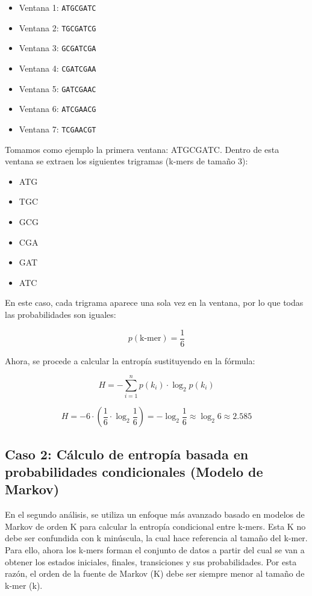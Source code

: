 \documentclass[11pt,spanish,listoffigures,listoftables]{tfgetsinf}
\begin{document}
\begin{itemize}
    \item Ventana 1: \texttt{ATGCGATC}
    \item Ventana 2: \texttt{TGCGATCG}
    \item Ventana 3: \texttt{GCGATCGA}
    \item Ventana 4: \texttt{CGATCGAA}
    \item Ventana 5: \texttt{GATCGAAC}
    \item Ventana 6: \texttt{ATCGAACG}
    \item Ventana 7: \texttt{TCGAACGT}
\end{itemize}

Tomamos como ejemplo la primera ventana: ATGCGATC. Dentro de esta ventana se extraen los siguientes trigramas (k-mers de tamaño 3):

\begin{itemize}
    \item ATG
    \item TGC
    \item GCG
    \item CGA
    \item GAT
    \item ATC
\end{itemize}

En este caso, cada trigrama aparece una sola vez en la ventana, por lo que todas las probabilidades son iguales:

\[
p(\text{k-mer}) = \frac{1}{6}
\]

Ahora, se procede a calcular la entropía sustituyendo en la fórmula:

\[
H = - \sum_{i=1}^{n} p(k_i) \cdot \log_2 p(k_i)
\]

\[
H = - 6 \cdot \left( \frac{1}{6} \cdot \log_2 \frac{1}{6} \right) = - \log_2 \frac{1}{6} \approx \log_2 6 \approx 2.585
\]


\subsection{Caso 2: Cálculo de entropía basada en probabilidades condicionales (Modelo de Markov)}

En el segundo análisis, se utiliza un enfoque más avanzado basado en modelos de Markov de orden K para calcular la entropía condicional entre k-mers. Esta K no debe ser confundida con k minúscula, la cual hace referencia al tamaño del k-mer. Para ello, ahora los k-mers forman el conjunto de datos a partir del cual se van a obtener los estados iniciales, finales, transiciones y sus probabilidades. Por esta razón, el orden de la fuente de Markov (K) debe ser siempre menor al tamaño de k-mer (k).
\end{document}
